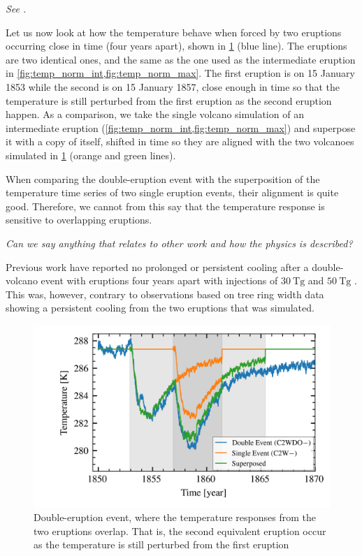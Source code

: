 \documentclass[twocol]{ametsocV5}
\begin{document}
\emph{See \citet{toohey2016b}.}


Let us now look at how the temperature behave when forced by two eruptions occurring
close in time (four years apart), shown in \cref{fig:double-overlap-superpose} (blue
line). The eruptions are two identical ones, and the same as the one used as the
intermediate eruption in \cref{fig:temp_norm_int,fig:temp_norm_max}. The first eruption
is on 15 January 1853 while the second is on 15 January 1857, close enough in time so
that the temperature is still perturbed from the first eruption as the second eruption
happen. As a comparison, we take the single volcano simulation of an intermediate
eruption (\cref{fig:temp_norm_int,fig:temp_norm_max}) and superpose it with a copy of
itself, shifted in time so they are aligned with the two volcanoes simulated in
\cref{fig:double-overlap-superpose} (orange and green lines).

When comparing the double-eruption event with the superposition of the temperature time
series of two single eruption events, their alignment is quite good. Therefore, we
cannot from this say that the temperature response is sensitive to overlapping
eruptions.

\emph{Can we say anything that relates to other work and how the physics is described?}

Previous work have reported no prolonged or persistent cooling after a double-volcano
event with eruptions four years apart with  injections of \( \SI{30}{\tera\gram}
\) and \( \SI{50}{\tera\gram} \) \citep{toohey2016b}. This was, however, contrary to
observations based on tree ring width data showing a persistent cooling from the two
eruptions that was simulated.

\begin{figure}
  \begin{center}
    \includegraphics[width=0.95\linewidth]{figures/double-overlap-superpose.png}
  \end{center}
  \caption{Double-eruption event, where the temperature responses from the two eruptions
    overlap. That is, the second equivalent eruption occur as the temperature is still
    perturbed from the first eruption}%
  \label{fig:double-overlap-superpose}
\end{figure}
\end{document}
